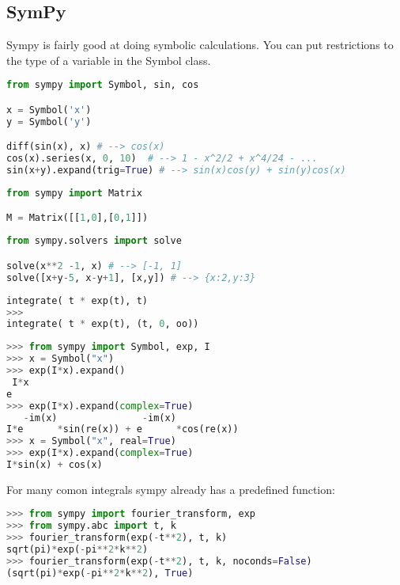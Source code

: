 \subsection{SymPy}

Sympy is fairly good at doing symbolic calculations. 
You can put restrictions to the type of a variable in the Symbol class. 

\begin{lstlisting}[language=python]
from sympy import Symbol, sin, cos

x = Symbol('x')
y = Symbol('y')

diff(sin(x), x) # --> cos(x)
cos(x).series(x, 0, 10)  # --> 1 - x^2/2 + x^4/24 - ...
sin(x+y).expand(trig=True) # --> sin(x)cos(y) + sin(y)cos(x)
\end{lstlisting}

\begin{lstlisting}[language=python]
from sympy import Matrix

M = Matrix([[1,0],[0,1]])
\end{lstlisting}

\begin{lstlisting}[language=python]
from sympy.solvers import solve

solve(x**2 -1, x) # --> [-1, 1]
solve([x+y-5, x-y+1], [x,y]) # --> {x:2,y:3}
\end{lstlisting}

\begin{lstlisting}[language=python]
integrate( t * exp(t), t)
>>> 
integrate( t * exp(t), (t, 0, oo))
\end{lstlisting}

\begin{lstlisting}[language=python]
>>> from sympy import Symbol, exp, I
>>> x = Symbol("x")
>>> exp(I*x).expand()
 I*x
e
>>> exp(I*x).expand(complex=True)
   -im(x)               -im(x)
I*e      *sin(re(x)) + e      *cos(re(x))
>>> x = Symbol("x", real=True)
>>> exp(I*x).expand(complex=True)
I*sin(x) + cos(x)
\end{lstlisting}

For many comon integrals sympy already has a predefined function: 

\begin{lstlisting}[language=python]
>>> from sympy import fourier_transform, exp
>>> from sympy.abc import t, k
>>> fourier_transform(exp(-t**2), t, k)
sqrt(pi)*exp(-pi**2*k**2)
>>> fourier_transform(exp(-t**2), t, k, noconds=False)
(sqrt(pi)*exp(-pi**2*k**2), True)
\end{lstlisting}

